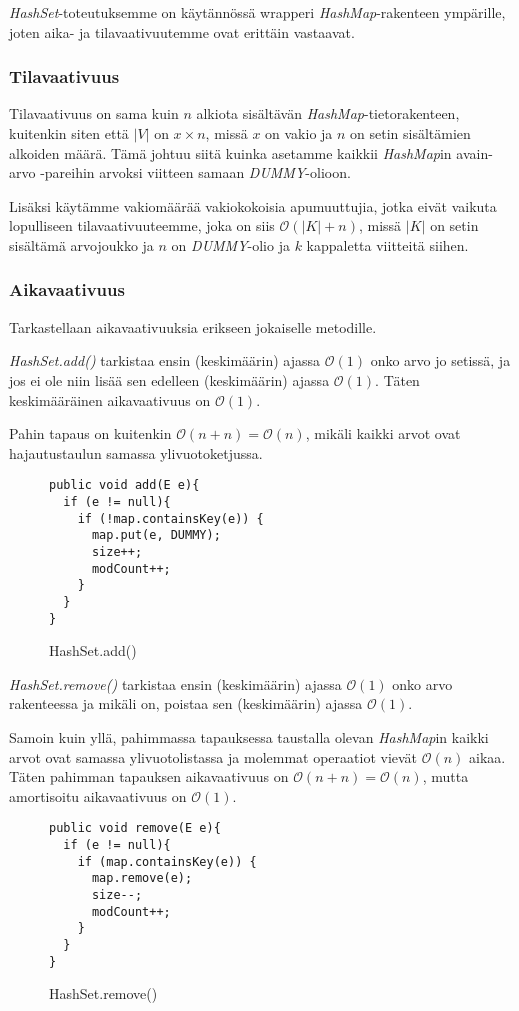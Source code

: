 \documentclass[12pt,a4paper]{article}
\begin{document}
\textit{HashSet}-toteutuksemme on käytännössä wrapperi \textit{HashMap}-rakenteen ympärille, joten aika- ja tilavaativuutemme ovat erittäin vastaavat.

\subsubsection*{Tilavaativuus}

Tilavaativuus on sama kuin $n$ alkiota sisältävän \textit{HashMap}-tietorakenteen, kuitenkin siten että $|V|$ on $x \times n$, missä $x$ on vakio ja $n$ on setin sisältämien alkoiden määrä. Tämä johtuu siitä kuinka asetamme kaikkii \textit{HashMap}in avain-arvo -pareihin arvoksi viitteen samaan \textit{DUMMY}-olioon.

Lisäksi käytämme vakiomäärää vakiokokoisia apumuuttujia, jotka eivät vaikuta lopulliseen tilavaativuuteemme, joka on siis $\mathcal{O}(|K| + n)$, missä $|K|$ on setin sisältämä arvojoukko ja $n$ on \textit{DUMMY}-olio ja $k$ kappaletta viitteitä siihen.

\subsubsection*{Aikavaativuus}

Tarkastellaan aikavaativuuksia erikseen jokaiselle metodille.

\textit{HashSet.add()} tarkistaa ensin (keskimäärin) ajassa $\mathcal{O}(1)$ onko arvo jo setissä, ja jos ei ole niin lisää sen edelleen (keskimäärin) ajassa $\mathcal{O}(1)$. Täten keskimääräinen aikavaativuus on $\mathcal{O}(1)$. 

Pahin tapaus on kuitenkin $\mathcal{O}(n + n) = \mathcal{O}(n)$, mikäli kaikki arvot ovat hajautustaulun samassa ylivuotoketjussa.

\begin{figure}[H]
\begin{lstlisting}
public void add(E e){
  if (e != null){
    if (!map.containsKey(e)) {
      map.put(e, DUMMY);
      size++;
      modCount++;
    }
  }
}
\end{lstlisting}
\caption{HashSet.add()}
\end{figure}

\textit{HashSet.remove()} tarkistaa ensin (keskimäärin) ajassa $\mathcal{O}(1)$ onko arvo rakenteessa ja mikäli on, poistaa sen (keskimäärin) ajassa $\mathcal{O}(1)$.

Samoin kuin yllä, pahimmassa tapauksessa taustalla olevan \textit{HashMap}in kaikki arvot ovat samassa ylivuotolistassa ja molemmat operaatiot vievät $\mathcal{O}(n)$ aikaa. Täten pahimman tapauksen aikavaativuus on $\mathcal{O}(n + n) = \mathcal{O}(n)$, mutta amortisoitu aikavaativuus on $\mathcal{O}(1)$.
\begin{figure}[H]
\begin{lstlisting}
public void remove(E e){
  if (e != null){
    if (map.containsKey(e)) {
      map.remove(e);
      size--;
      modCount++;
    }
  }
}
\end{lstlisting}
\caption{HashSet.remove()}
\end{figure}
\end{document}
